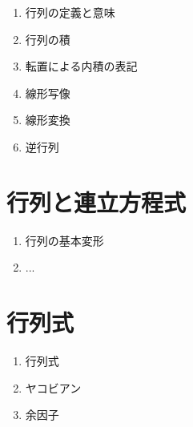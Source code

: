 \documentclass[../imaging-math]{subfiles}
\begin{document}
\begin{mindflow}
  \begin{enumerate}
    \item 行列の定義と意味
    \item 行列の積
    \item 転置による内積の表記
    \item 線形写像
    \item 線形変換
    \item 逆行列
  \end{enumerate}
\end{mindflow}

\section{行列と連立方程式}

\begin{mindflow}
  \begin{enumerate}
    \item 行列の基本変形
    \item ...
  \end{enumerate}
\end{mindflow}

\section{行列式}

\begin{mindflow}
  \begin{enumerate}
    \item 行列式
    \item ヤコビアン
    \item 余因子
  \end{enumerate}
\end{mindflow}
\end{document}
